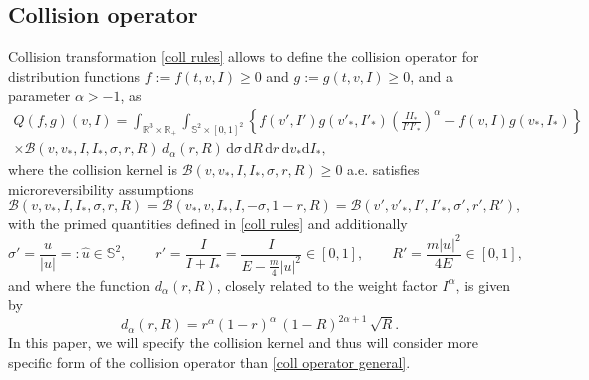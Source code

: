 \documentclass[11pt,a4paper]{amsart}
\newcommand{\bRp}{\mathbb{R}_+}
\newcommand{\bRfp}{\mathbb{R}^3 \times \bRp}
\newcommand{\bS}{\mathbb{S}^2}
\newcommand{\md}{\mathrm{d}}
\newcommand{\dpo}{d_\alpha(r,R)}
\newcommand{\param}{ \sigma, r, R}
\newcommand{\params}{ - \sigma, 1 - r, R}
\newcommand{\paramp}{  \sigma', r', R'}
\newcommand{\domparamgen}{\bS \times [0,1]^2}
\newcommand{\istargenintro}{\int_{ \bRfp} \int_{ \domparamgen }}
\newcommand{\dstar}{ \md \sigma \, \md R \, \md r \, \md v_* \md I_*}
\begin{document}
 \subsection{Collision operator}	 Collision transformation \eqref{coll rules} allows to define the collision operator for distribution functions $f:= f(t,v,I)\geq 0$ and $g:= g(t,v,I)\geq0$, and a parameter $\alpha >-1$, as
 \begin{multline}\label{coll operator general}
 	Q(f,g)(v,I) =\istargenintro \left\{ f(v',I')g(v'_*,I'_*) \left(\frac{I I_*}{I' I'_*}\right)^{\alpha}   - f(v,I)g(v_*, I_*) \right\} \\ \times  \mathcal{B}(v,v_*,I,I_*,\param)  \, \dpo  \, \dstar,
 \end{multline}
 where the collision kernel is $ \mathcal{B}(v,v_*,I,I_*,\param) \geq 0$ a.e. satisfies microreversibility assumptions 
 \begin{equation}\label{coll kernel general}
 	\mathcal{B}(v,v_*,I,I_*,\param)  =  \mathcal{B}(v_*,v,I_*,I, \params) =  \mathcal{B}(v',v'_*,I',I'_*,\paramp), 
 \end{equation}
 with the primed quantities defined in   \eqref{coll rules} and  additionally
 \begin{equation}\label{primed param}
 	\sigma'=\frac{u}{\left|u\right|} =: \hat{u} \in \bS, \qquad	r'=\frac{I}{I+I_*} = \frac{I}{E-\frac{m}{4}\left| u \right|^2} \in [0,1], \qquad R'=\frac{m \left|u\right|^2}{4 E} \in [0,1],
 \end{equation} 
 and where 	the function $\dpo$,  closely related to the weight factor $I^\alpha$,   is given by 
 \begin{equation}\label{fun r R}
 	\dpo =	  r^{\alpha}(1-r)^{\alpha} \, (1-R)^{2\alpha+1} \, \sqrt{R}.
 \end{equation} 
 In this paper, we will specify the collision kernel and thus will consider more specific form of the collision operator than \eqref{coll operator general}.
 
\end{document}

